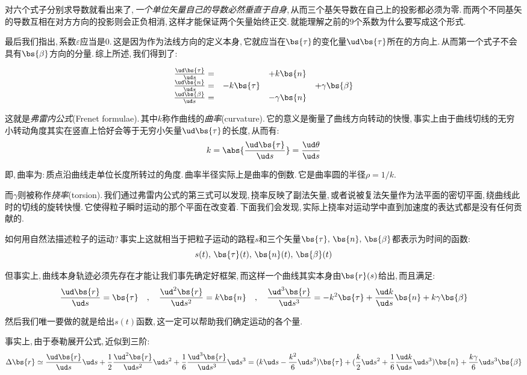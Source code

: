 对六个式子分别求导数就看出来了,\,\emph{一个单位矢量自己的导数必然垂直于自身},\,从而三个基矢导数在自己上的投影都必须为零.\,而两个不同基矢的导数互相在对方方向的投影则会正负相消,\,这样才能保证两个矢量始终正交.\,就能理解之前的$9$个系数为什么要写成这个形式.

最后我们指出,\,系数$\varepsilon$应当是$0$.\,这是因为作为法线方向的定义本身,\,它就应当在$\bs{\tau}$的变化量$\ud\bs{\tau}$所在的方向上.\,从而第一个式子不会具有$\bs{\beta}$方向的分量.\,综上所述,\,我们得到了:

\[\begin{array}{rlll}
\frac{\ud \bs{\tau}}{\ud s}=		&	 	&	+k\bs{n} 		& \\
\frac{\ud \bs{n}}{\ud s}=		&	-k\bs{\tau} 	&	 		& +\gamma\bs{\beta}\\
\frac{\ud \bs{\beta}}{\ud s}=		&	 	&	-\gamma\bs{n} 		& 
\end{array}\]

这就是\emph{弗雷内公式}(Frenet formulae).\,其中$k$称作曲线的\emph{曲率}(curvature).\,它的意义是衡量了曲线方向转动的快慢,\,事实上由于曲线切线的无穷小转动角度其实在竖直上恰好会等于无穷小矢量$\ud\bs{\tau}$的长度,\,从而有:
\[k=\abs{\frac{\ud\bs{\tau}}{\ud s}}=\frac{\ud\theta}{\ud s}\]

即,\,曲率为:\,质点沿曲线走单位长度所转过的角度.\,曲率半径实际上是曲率的倒数.\,它是曲率圆的半径$\rho=1/k$.

而$\gamma$则被称作\emph{挠率}(torsion).\,我们通过弗雷内公式的第三式可以发现,\,挠率反映了副法矢量,\,或者说被复法矢量作为法平面的密切平面,\,绕曲线此时的切线的旋转快慢.\,它使得粒子瞬时运动的那个平面在改变着.\,下面我们会发现,\,实际上挠率对运动学中直到加速度的表达式都是没有任何贡献的.

如何用自然法描述粒子的运动?\,事实上这就相当于把粒子运动的路程$s$和三个矢量$\bs{\tau},\,\bs{n},\,\bs{\beta}$都表示为时间的函数:
\[s(t),\,\bs{\tau}(t),\,\bs{n}(t),\,\bs{\beta}(t)\]

但事实上,\,曲线本身轨迹必须先存在才能让我们事先确定好框架,\,而这样一个曲线其实本身由$\bs{r}(s)$给出,\,而且满足:
\[\frac{\ud \bs{r}}{\ud s}=\bs{\tau}\quad,\quad \frac{\ud^2 \bs{r}}{\ud s^2}=k\bs{n}\quad,\quad \frac{\ud^3 \bs{r}}{\ud s^3}=-k^2\bs{\tau}+\frac{\ud k}{\ud s}\bs{n}+k\gamma\bs{\beta}\]

然后我们唯一要做的就是给出$s(t)$函数,\,这一定可以帮助我们确定运动的各个量.

事实上,\,由于泰勒展开公式,\,近似到三阶:
\[\Delta \bs{r}\simeq\frac{\ud \bs{r}}{\ud s}\ud s+\frac{1}{2}\frac{\ud^2 \bs{r}}{\ud s^2}\ud s^2+\frac{1}{6}\frac{\ud^3 \bs{r}}{\ud s^3}\ud s^3=(k\ud s-\frac{k^2}{6}\ud s^3)\bs{\tau}+(\frac{k}{2}\ud s^2+\frac{1}{6}\frac{\ud k}{\ud s}\ud s^3)\bs{n}+\frac{k\gamma}{6}\ud s^3\bs{\beta}\]

